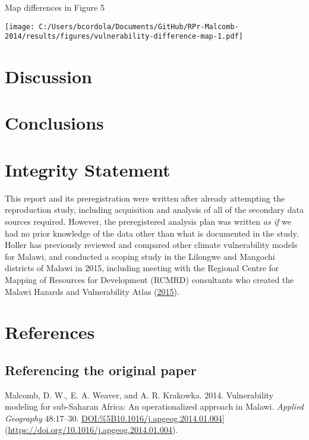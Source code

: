 \documentclass[
]{article}
\begin{document}
Map differences in Figure 5

\texttt{[image: C:/Users/bcordola/Documents/GitHub/RPr-Malcomb-2014/results/figures/vulnerability-difference-map-1.pdf]}

\hypertarget{discussion}{%
\section{Discussion}\label{discussion}}

\hypertarget{conclusions}{%
\section{Conclusions}\label{conclusions}}

\hypertarget{integrity-statement}{%
\section{Integrity Statement}\label{integrity-statement}}

This report and its preregistration were written after already
attempting the reproduction study, including acquisition and analysis of
all of the secondary data sources required. However, the preregistered
analysis plan was written \emph{as if} we had no prior knowledge of the
data other than what is documented in the study. Holler has previously
reviewed and compared other climate vulnerability models for Malawi, and
conducted a scoping study in the Lilongwe and Mangochi districts of
Malawi in 2015, including meeting with the Regional Centre for Mapping
of Resources for Development (RCMRD) consultants who created the Malawi
Hazards and Vulnerability Atlas
(\href{https://doi.org/10.13140/RG.2.1.1460.0402}{2015}).

\hypertarget{references}{%
\section{References}\label{references}}

\hypertarget{referencing-the-original-paper}{%
\subsection{Referencing the original
paper}\label{referencing-the-original-paper}}

Malcomb, D. W., E. A. Weaver, and A. R. Krakowka. 2014. Vulnerability
modeling for sub-Saharan Africa: An operationalized approach in Malawi.
\emph{Applied Geography} 48:17--30.
\url{DOI:\%5B10.1016/j.apgeog.2014.01.004}{]}(\url{https://doi.org/10.1016/j.apgeog.2014.01.004}).
\end{document}
